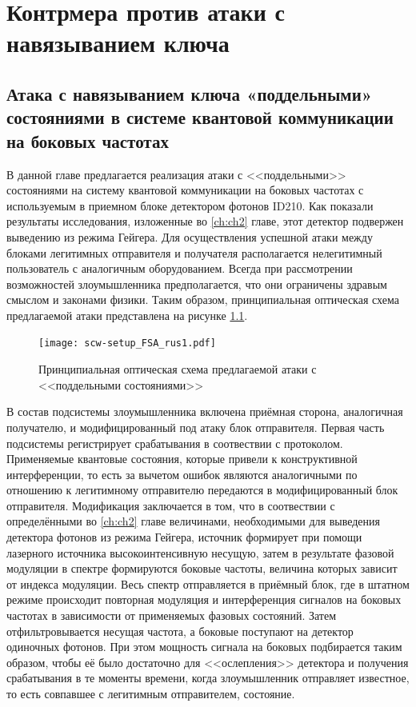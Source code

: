 \chapter{Контрмера против атаки с навязыванием ключа} \label{ch:ch3}


\section{Атака с навязыванием ключа «поддельными» состояниями в системе квантовой коммуникации на боковых частотах} \label{sec:ch3/sec1}

В данной главе предлагается реализация атаки с <<поддельными>> состояниями на систему квантовой коммуникации на боковых частотах с используемым в приемном блоке детектором фотонов ID210. Как показали результаты исследования, изложенные во \ref{ch:ch2} главе, этот детектор подвержен выведению из режима Гейгера. Для осуществления успешной атаки между блоками легитимных отправителя и получателя располагается нелегитимный пользователь с аналогичным оборудованием. Всегда при рассмотрении возможностей злоумышленника предполагается, что они ограничены здравым смыслом и законами физики. Таким образом, принципиальная оптическая схема предлагаемой атаки представлена на рисунке \ref{fig:SCW_FSA}. 

 \begin{figure}[ht]
  \centering
  \texttt{[image: scw-setup\_FSA\_rus1.pdf]}
  \caption{Принципиальная оптическая схема предлагаемой атаки с <<поддельными состояниями>>}
  \label{fig:SCW_FSA}
\end{figure}

В состав подсистемы злоумышленника включена приёмная сторона, аналогичная получателю, и модифицированный под атаку блок отправителя. Первая часть подсистемы регистрирует срабатывания в соотвествии с протоколом. Применяемые квантовые состояния, которые привели к конструктивной интерференции, то есть за вычетом ошибок являются аналогичными по отношению к легитимному отправителю передаются в модифицированный блок отправителя. Модификация заключается в том, что в соотвествии с определёнными во \ref{ch:ch2} главе величинами, необходимыми для выведения детектора фотонов из режима Гейгера, источник формирует при помощи лазерного источника высокоинтенсивную несущую, затем в результате фазовой модуляции в спектре формируются боковые частоты, величина которых зависит от индекса модуляции. Весь спектр отправляется в приёмный блок, где в штатном режиме происходит повторная модуляция и интерференция сигналов на боковых частотах в зависимости от применяемых фазовых состояний. Затем отфильтровывается несущая частота, а боковые поступают на детектор одиночных фотонов. При этом мощность сигнала на боковых подбирается таким образом, чтобы её было достаточно для <<ослепления>> детектора и получения срабатывания в те моменты времени, когда злоумышленник отправляет известное, то есть совпавшее с легитимным отправителем, состояние. 


